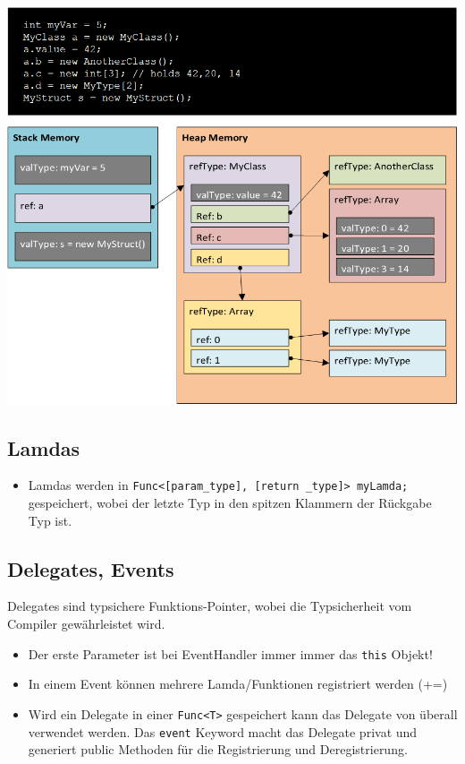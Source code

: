 \documentclass[
a4paper,
oneside,
10pt,
fleqn,
headsepline,
toc=listofnumbered, 
bibliography=totocnumbered]{scrartcl}
\begin{document}
\begin{minipage}[t]{0.8\textwidth}
\centering
\includegraphics[width=0.8\linewidth]{images/reference_value_type}
\end{minipage}
\clearpage

\subsection{Lamdas}
\begin{itemize}
	\item Lamdas werden in \lstinline|Func<[param_type], [return _type]> myLamda;| gespeichert, wobei der letzte Typ in den spitzen Klammern der Rückgabe Typ ist.
\end{itemize}

\subsection{Delegates, Events}
Delegates sind typsichere Funktions-Pointer, wobei die Typsicherheit vom Compiler gewährleistet wird. 
\begin{itemize}
	\item Der erste Parameter ist bei EventHandler immer immer das \lstinline|this| Objekt!
	\item In einem Event können mehrere Lamda/Funktionen registriert werden (+=)
	\item Wird ein Delegate in einer \lstinline|Func<T>| gespeichert kann das Delegate von überall verwendet werden. Das \lstinline|event| Keyword macht das Delegate privat und generiert public Methoden für die Registrierung und Deregistrierung.
\end{itemize}
\end{document}
